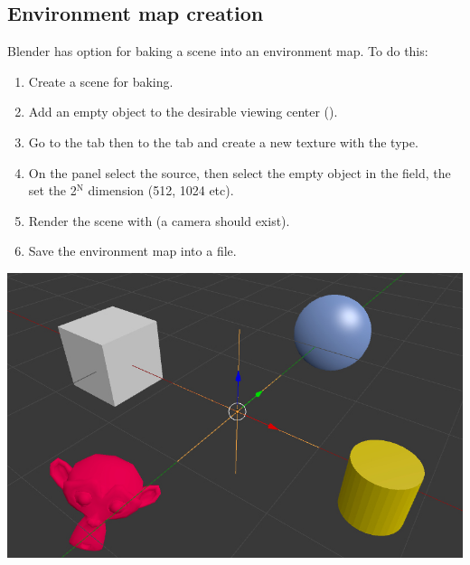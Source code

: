 \documentclass[a4paper,12pt,oneside]{sphinxmanual}
\begin{document}
\subsection{Environment map creation}
\label{textures:id18}
Blender has option for baking a scene into an environment map. To do this:
\begin{enumerate}
\item {} 
Create a scene for baking.

\item {} 
Add an empty object to the desirable viewing center ().

\item {} 
Go to the  tab then to the  tab and create a new texture with the  type.

\item {} 
On the  panel select the  source, then select the empty object in the  field, the set the 2$^{\text{N}}$ dimension (512, 1024 etc).

\item {} 
Render the scene with  (a camera should exist).

\item {} 
Save the environment map into a file.

\end{enumerate}

{\hfill\includegraphics[width=1.000\linewidth]{environment_map_baking_scene.jpg}\hfill}

\begin{DUlineblock}{0em}
\item[] 
\end{DUlineblock}
\end{document}
